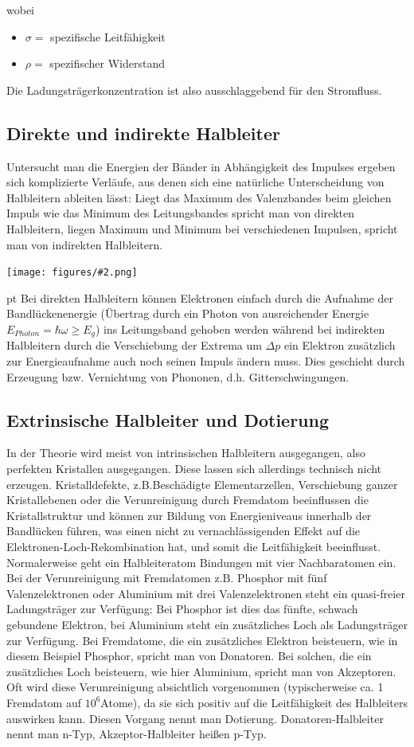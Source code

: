 \documentclass[12pt]{article}
\newcommand{\gra}[3][0.7]{
	\begin{minipage}[h!]{\textwidth}
		\centering
		\texttt{[image: figures/\#2.png]}
		\captionof{figure}{#3}
	\end{minipage}
	\vskip 30 pt
	}
\begin{document}
wobei 
\begin{itemize}
\item $\sigma =$ spezifische Leitfähigkeit
\item  $\rho =$ spezifischer Widerstand
\end{itemize}
Die Ladungsträgerkonzentration ist also ausschlaggebend für den Stromfluss.

\subsection{Direkte und indirekte Halbleiter}

Untersucht man die Energien der Bänder in Abhängigkeit des Impulses ergeben sich komplizierte Verläufe, aus denen sich eine natürliche Unterscheidung von Halbleitern ableiten lässt: Liegt das Maximum des Valenzbandes beim gleichen Impuls wie das Minimum des Leitungsbandes spricht man von direkten Halbleitern, liegen Maximum und Minimum bei verschiedenen Impulsen, spricht man von indirekten Halbleitern.

\gra{(in)direkte_Halbleiter}{Direkte und indirekte Halbleiter}\cite{staat}
Bei direkten Halbleitern können Elektronen einfach durch die Aufnahme der Bandlückenenergie (Übertrag durch ein Photon von ausreichender Energie $E_{Photon}=\hbar\omega\geq E_g$) ins Leitungsband gehoben werden während bei indirekten Halbleitern durch die Verschiebung der Extrema um $\Delta p$ ein Elektron zusätzlich zur Energieaufnahme auch noch seinen Impuls ändern muss. Dies geschieht durch Erzeugung bzw. Vernichtung von Phononen, d.h. Gitterschwingungen.

\subsection{Extrinsische Halbleiter und Dotierung}

In der Theorie wird meist von intrinsischen Halbleitern ausgegangen, also perfekten Kristallen ausgegangen.  Diese lassen sich allerdings technisch nicht erzeugen. Kristalldefekte, z.B.Beschädigte Elementarzellen, Verschiebung ganzer Kristallebenen oder die Verunreinigung durch Fremdatom beeinflussen die Kristallstruktur und können zur Bildung von Energieniveaus innerhalb der Bandlücken führen, was einen nicht zu vernachlässigenden Effekt auf die Elektronen-Loch-Rekombination hat, und somit die Leitfähigkeit beeinflusst.\\
Normalerweise geht ein Halbleiteratom Bindungen mit vier Nachbaratomen ein. Bei der Verunreinigung mit Fremdatomen z.B. Phosphor mit fünf Valenzelektronen oder Aluminium mit drei Valenzelektronen steht ein quasi-freier Ladungsträger zur Verfügung: Bei Phosphor ist dies das fünfte, schwach gebundene Elektron, bei Aluminium steht ein zusätzliches Loch als Ladungsträger zur Verfügung. Bei Fremdatome, die ein zusätzliches Elektron beisteuern, wie in diesem Beispiel Phosphor, spricht man von Donatoren. Bei solchen, die ein zusätzliches Loch beisteuern, wie hier Aluminium, spricht man von Akzeptoren.
Oft wird diese Verunreinigung absichtlich vorgenommen (typischerweise ca. 1 Fremdatom auf $10^6$Atome), da sie sich positiv auf die Leitfähigkeit des Halbleiters auswirken kann. Diesen Vorgang nennt man Dotierung. Donatoren-Halbleiter nennt man n-Typ, Akzeptor-Halbleiter heißen p-Typ.
\end{document}

